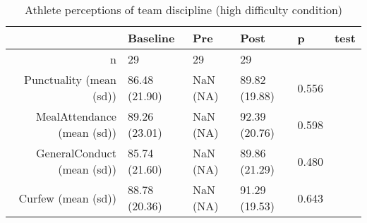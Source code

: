 \begin{table}[ht]
\centering
\begin{tabular}{rlllll}
  \hline
 & Baseline & Pre & Post & p & test \\ 
  \hline
n &    29 &  29 &    29 &  &  \\ 
  Punctuality (mean (sd)) & 86.48 (21.90) & NaN (NA) & 89.82 (19.88) &  0.556 &  \\ 
  MealAttendance (mean (sd)) & 89.26 (23.01) & NaN (NA) & 92.39 (20.76) &  0.598 &  \\ 
  GeneralConduct (mean (sd)) & 85.74 (21.60) & NaN (NA) & 89.86 (21.29) &  0.480 &  \\ 
  Curfew (mean (sd)) & 88.78 (20.36) & NaN (NA) & 91.29 (19.53) &  0.643 &  \\ 
   \hline
\end{tabular}
\caption{Athlete perceptions of 
 team discipline (high difficulty condition)} 
\end{table}
